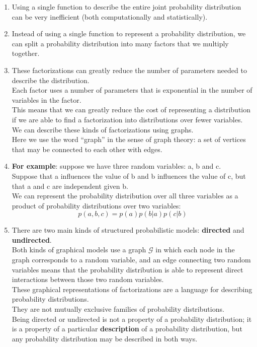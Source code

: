 \begin{enumerate}
    \item Using a single function to describe the entire joint probability distribution can be very inefficient (both computationally and statistically).

    \item Instead of using a single function to represent a probability distribution, we can split a probability distribution into many factors that we multiply together.

    \item These factorizations can greatly reduce the number of parameters needed to describe the distribution.\\
    Each factor uses a number of parameters that is exponential in the number of variables in the factor.\\
    This means that we can greatly reduce the cost of representing a distribution if we are able to find a factorization into distributions over fewer variables.\\
    We can describe these kinds of factorizations using graphs. \\
    Here we use the word “graph” in the sense of graph theory: a set of vertices that may be connected to each other with edges.

    \item \textbf{For example}: suppose we have three random variables: a, b and c.\\
    Suppose that a influences the value of b and b influences the value of c, but that a and c are independent given b.\\
    We can represent the probability distribution over all three variables as a product of probability distributions over two variables:
    \[
        p(a,b,c) = p(a) p(b|a) p(c| b)
    \]

    \item There are two main kinds of structured probabilistic models: \textbf{directed} and \textbf{undirected}.\\
    Both kinds of graphical models use a graph $\mathcal{G}$ in which each node in the graph corresponds to a random variable, and an edge connecting two random variables means that the probability distribution is able to represent direct interactions between those two random variables.\\
    These graphical representations of factorizations are a language for describing probability distributions.\\
    They are not mutually exclusive families of probability distributions.\\
    Being directed or undirected is not a property of a probability distribution; it is a property of a particular \textbf{description} of a probability distribution, but any probability distribution may be described in both ways.
\end{enumerate}

